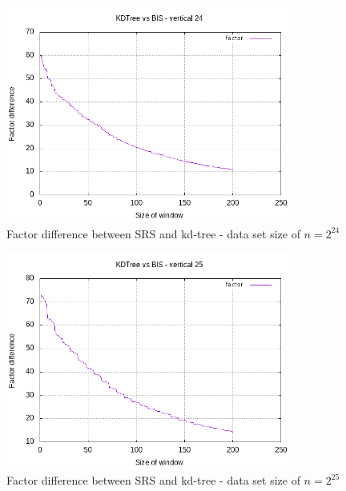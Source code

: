 \begin{figure}[h]
    \centering
    \includegraphics[width = 0.85\textwidth]{pictures/analysis/smalls/vert_fac_24.png}
    \caption{Factor difference between SRS and kd-tree - data set size of $n=2^{24}$}\label{fig:small_vert_fac_24}
\end{figure}

\begin{figure}[h]
    \centering
    \includegraphics[width = 0.85\textwidth]{pictures/analysis/smalls/vert_fac_25.png}
    \caption{Factor difference between SRS and kd-tree - data set size of $n=2^{25}$}\label{fig:small_vert_fac_25}
\end{figure}

